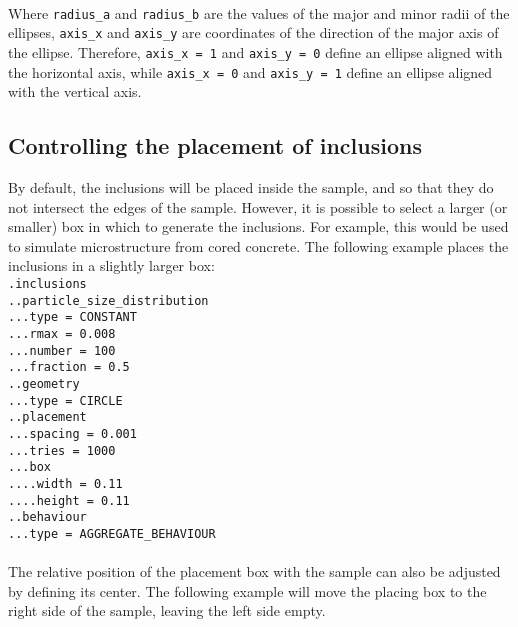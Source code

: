 \documentclass[10pt]{article}
\begin{document}
\paragraph{}Where \verb+radius_a+ and \verb+radius_b+ are the values of the major and minor radii of the ellipses, \verb+axis_x+ and \verb+axis_y+ are coordinates of the direction of the major axis of the ellipse. Therefore, \verb+axis_x = 1+ and \verb+axis_y = 0+ define an ellipse aligned with the horizontal axis, while \verb+axis_x = 0+ and \verb+axis_y = 1+ define an ellipse aligned with the vertical axis.

\subsection{Controlling the placement of inclusions}

By default, the inclusions will be placed inside the sample, and so that they do not intersect the edges of the sample. However, it is possible to select a larger (or smaller) box in which to generate the inclusions. For example, this would be used to simulate microstructure from cored concrete. The following example places the inclusions in a slightly larger box:\\

\noindent \verb+.inclusions+\\
\verb+..particle_size_distribution+\\
\verb+...type = CONSTANT+\\
\verb+...rmax = 0.008+\\
\verb+...number = 100+\\
\verb+...fraction = 0.5+\\
\verb+..geometry+\\
\verb+...type = CIRCLE+\\
\verb+..placement+\\
\verb+...spacing = 0.001+\\
\verb+...tries = 1000+\\
\verb+...box+\\
\verb+....width = 0.11+\\
\verb+....height = 0.11+\\
\verb+..behaviour+\\
\verb+...type = AGGREGATE_BEHAVIOUR+

\paragraph{}The relative position of the placement box with the sample can also be adjusted by defining its center. The following example will move the placing box to the right side of the sample, leaving the left side empty.\\
\end{document}
